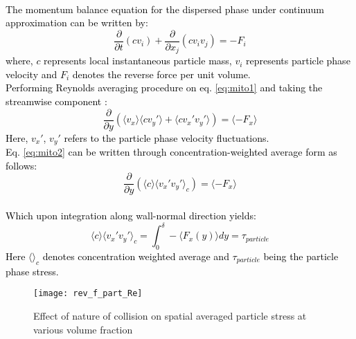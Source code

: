 \documentclass[aip,graphicx]{revtex4-1}
\begin{document}
\\\textcolor{black}{ The momentum balance equation for the dispersed phase under continuum approximation can be written by: 
\begin{equation}
\frac{\partial}{\partial t}(c v_i) +  \frac{\partial}{\partial x_j}(c v_i v_j) =-F_i 
\label{eq:mito1}
\end{equation}
where, $c$ represents local instantaneous particle mass, $v_i$ represents particle phase velocity and $F_i$ denotes the reverse force per unit volume.
\\Performing Reynolds averaging procedure on eq. \ref{eq:mito1} and taking the streamwise component : 
\begin{equation}
\frac{\partial}{\partial y}\left(\langle v_x \rangle \langle c v_y' \rangle+\langle c v_x' v_y'\rangle\right) =\langle -F_x \rangle
\label{eq:mito2}
\end{equation}
Here, $v_x'$, $v_y'$ refers to the particle phase velocity fluctuations.
\\Eq. \ref{eq:mito2} can be written through concentration-weighted average form as follows: 
\begin{equation}
\frac{\partial}{\partial y}\left(\langle c \rangle \langle v_x' v_y' \rangle_c\right) =\langle -F_x \rangle
\label{eq:mito3}
\end{equation}
\\ Which upon integration along wall-normal direction yields:
\begin{equation}
\langle c \rangle \langle v_x' v_y' \rangle_c =\int_{0}^{\delta}-\langle F_x(y)\rangle dy =\tau_{particle}
\label{eq:mito4}
\end{equation}
Here  $\langle  \rangle_c$ denotes concentration weighted average and $\tau_{particle}$ being the particle phase stress. }
\begin{figure}[!h]
\texttt{[image: rev\_f\_part\_Re]}
\caption{Effect of nature of collision on spatial averaged particle stress at various volume fraction}
\label{fig:spat_av_part_re_stress}
\end{figure}
\end{document}
